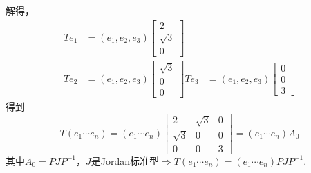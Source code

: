 \documentclass[12pt, a4paper, oneside, fontset=none]{ctexart}
\begin{document}
解得，
\begin{align*}
    Te_1 & = (e_1,e_2,e_3)\begin{bmatrix}
                              2        \\
                              \sqrt{3} \\
                              0
                          \end{bmatrix} \\
    Te_2 & = (e_1,e_2,e_3)\begin{bmatrix}
                              \sqrt{3} \\
                              0        \\
                              0
                          \end{bmatrix}
    Te_3 & = (e_1,e_2,e_3)\begin{bmatrix}
                              0 \\
                              0 \\
                              3
                          \end{bmatrix}
\end{align*}
得到
\[
    T(e_1\cdots e_n) = (e_1\cdots e_n)\begin{bmatrix}
        2        & \sqrt{3} & 0 \\
        \sqrt{3} & 0        & 0 \\
        0        & 0        & 3
    \end{bmatrix} = (e_1\cdots e_n)A_0
\]
其中$A_0 = PJP^{-1}$，$J$是Jordan标准型$\Rightarrow T(e_1\cdots e_n) = (e_1\cdots e_n)PJP^{-1}.$
\end{document}
